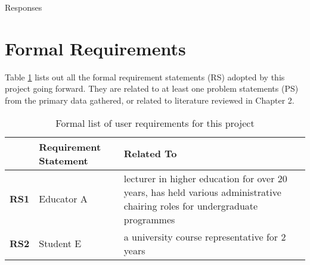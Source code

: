 Responses

\section{Formal Requirements}

Table \ref{table:formal-reqs} lists out all the formal requirement statements (RS) adopted by this 
project going forward. They are related to at least one problem statements (PS) from the primary data 
gathered, or related to literature reviewed in Chapter 2.

\begin{table}[!h] 
    \caption{Formal list of user requirements for this project}
    \centering
    \label{table:formal-reqs}
    \begin{tabularx}{\textwidth}{>{\bfseries}lXX}
        & Requirement Statement & Related To\\
        \toprule
        RS1 & Educator A & lecturer in higher education for over 20 years, has held various administrative 
        chairing roles for undergraduate programmes\\\midrule
        RS2 & Student E & a university course representative for 2 years\\\bottomrule
    \end{tabularx}
\end{table}
